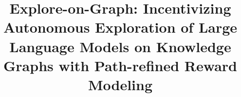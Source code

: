 

\title{Explore-on-Graph: Incentivizing Autonomous Exploration of Large Language Models on Knowledge Graphs with Path-refined Reward Modeling}



